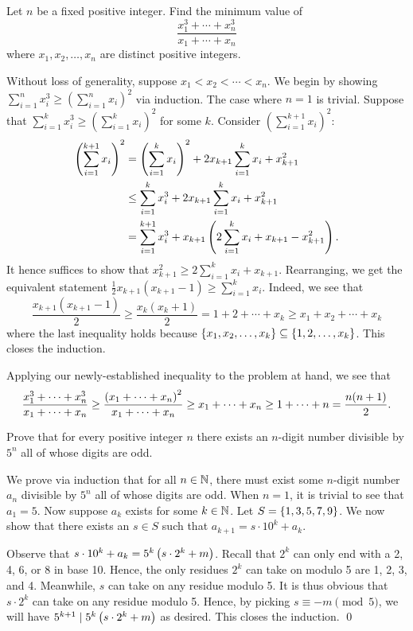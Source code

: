 \begin{question}[$\frac12 n{(n+1)}$]\label{A::2024-O-2-2}
    Let $n$ be a fixed positive integer. Find the minimum value of \[\frac{x_1^3 + \cdots + x_n^3}{x_1 + \cdots + x_n}\] where $x_1, x_2, \ldots, x_n$ are distinct positive integers.
\end{question}
\begin{solution*}
    Without loss of generality, suppose $x_1 < x_2 < \cdots < x_n$. We begin by showing $\sum_{i=1}^{n} x_i^3 \geq (\sum_{i=1}^n x_i)^2$ via induction. The case where $n = 1$ is trivial. Suppose that $\sum_{i=1}^{k} x_i^3 \geq (\sum_{i=1}^k x_i)^2$ for some $k$. Consider $(\sum_{i=1}^{k+1} x_i)^2$:
    \begin{align*}
        \left( \sum_{i=1}^{k+1} x_i \right)^2 &= \left( \sum_{i=1}^{k} x_i \right)^2 + 2x_{k+1}\sum_{i=1}^{k} x_i + x_{k+1}^2\\
        &\leq \sum_{i=1}^{k} x_i^3 + 2x_{k+1}\sum_{i=1}^{k} x_i + x_{k+1}^2\\
        &= \sum_{i=1}^{k+1} x_i^3 + x_{k+1} \left( 2\sum_{i=1}^{k} x_i + x_{k+1} - x_{k+1}^2 \right).
    \end{align*}
    It hence suffices to show that $x_{k+1}^2 \geq 2\sum_{i=1}^{k} x_i + x_{k+1}$. Rearranging, we get the equivalent statement $\frac12 x_{k+1} (x_{k+1} - 1) \geq \sum_{i=1}^k x_i$. Indeed, we see that \[\frac{x_{k+1}(x_{k+1} - 1)}2 \geq \frac{x_k (x_k + 1)}2 = 1 + 2 + \cdots + x_k \geq x_1 + x_2 + \cdots + x_k\] where the last inequality holds because $\left\lbrace x_1, x_2, \ldots, x_k \right\rbrace \subseteq \left\lbrace 1, 2, \ldots, x_k \right\rbrace$. This closes the induction.
    
    Applying our newly-established inequality to the problem at hand, we see that \[\frac{x_1^3 + \cdots + x_n^3}{x_1 + \cdots + x_n} \geq \frac{\left( x_1 + \cdots + x_n \right)^2}{x_1 + \cdots + x_n} \geq x_1 + \cdots + x_n \geq 1 + \cdots + n = \frac{n(n+1)}2.\]    
\end{solution*}

\begin{question}\label{A::2024-O-2-3}
    Prove that for every positive integer $n$ there exists an $n$-digit number divisible by $5^n$ all of whose digits are odd.
\end{question}
\begin{solution*}
    We prove via induction that for all $n \in \mathbb{N}$, there must exist some $n$-digit number $a_n$  divisible by $5^n$ all of whose digits are odd. When $n = 1$, it is trivial to see that $a_1 = 5$. Now suppose $a_k$ exists for some $k \in \mathbb{N}$. Let $S = \left\lbrace 1, 3, 5, 7, 9 \right\rbrace$. We now show that there exists an $s \in S$ such that $a_{k+1} = s \cdot 10^k + a_k$.

    Observe that $s \cdot 10^k + a_k = 5^k \left( s \cdot 2^k + m \right)$. Recall that $2^k$ can only end with a 2, 4, 6, or 8 in base 10. Hence, the only residues $2^k$ can take on modulo 5 are 1, 2, 3, and 4. Meanwhile, $s$ can take on any residue modulo 5. It is thus obvious that $s \cdot 2^k$ can take on any residue modulo 5. Hence, by picking $s \equiv -m \pmod{5}$, we will have $5^{k+1} \mid 5^k \left( s \cdot 2^k + m \right)$ as desired. This closes the induction. \qed
\end{solution*}

